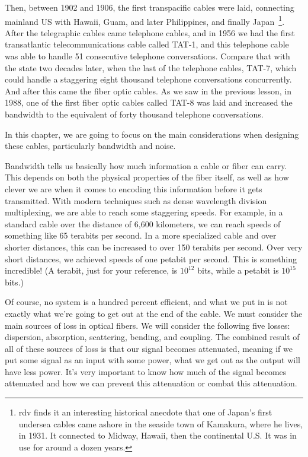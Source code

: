 Then, between 1902 and 1906, the first transpacific cables were laid, connecting mainland US with Hawaii, Guam, and later Philippines, and finally Japan~\footnote{rdv finds it an interesting historical anecdote that one of Japan's first undersea cables came ashore in the seaside town of Kamakura, where he lives, in 1931.  It connected to Midway, Hawaii, then the continental U.S.  It was in use for around a dozen years.}. After the telegraphic cables came telephone cables, and in 1956 we had the first transatlantic telecommunications cable called TAT-1, and this telephone cable was able to handle 51 consecutive telephone conversations. Compare that with the state two decades later, when the last of the  telephone cables, TAT-7, which could handle a staggering eight thousand telephone conversations concurrently. And after this came the fiber optic cables. As we saw in the previous lesson, in 1988, one of the first fiber optic cables called TAT-8 was laid and increased the bandwidth to the equivalent of forty thousand telephone conversations.


In this chapter, we are going to focus on the main considerations when designing these cables, particularly bandwidth and noise.

Bandwidth tells us basically how much information a cable or fiber can carry.
This depends on both the physical properties of the fiber itself, as well as how clever we are when it comes to encoding this information before it gets transmitted. With modern techniques such as dense wavelength division multiplexing, we are able to reach some staggering speeds. For example, in a standard cable over the distance of 6,600 kilometers, we can reach speeds of something like 65 terabits per second. In a more specialized cable and over shorter distances, this can be increased to over 150 terabits per second. Over very short distances, we achieved speeds of one petabit per second. This is something incredible! (A terabit, just for your reference, is $10^{12}$ bits, while a petabit is $10^{15}$ bits.)

Of course, no system is a hundred percent efficient, and what we put in is not exactly what we're going to get out at the end of the cable. We must consider the main sources of loss in optical fibers. We will consider the following five losses: dispersion, absorption, scattering, bending, and coupling. The combined result of all of these sources of loss is that our signal becomes attenuated, meaning if we put some signal as an input with some power, what we get out as the output will have less power. It's very important to know how much of the signal becomes attenuated and how we can prevent this attenuation or combat this attenuation.

